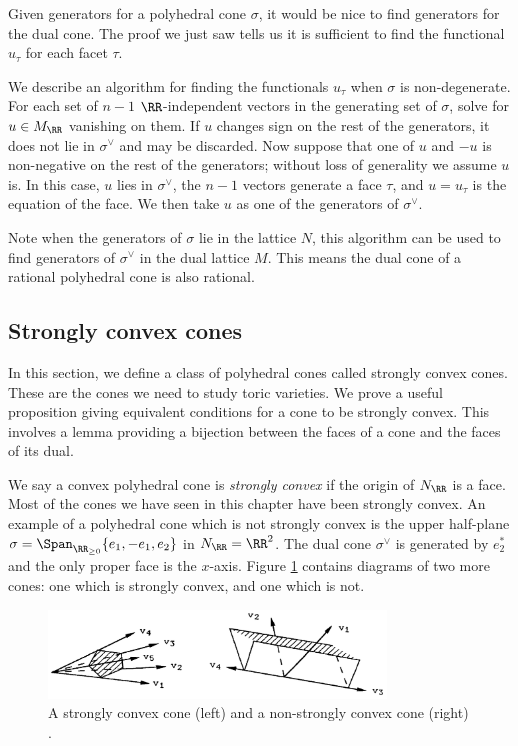 \documentclass[12pt]{amsart}
\theoremstyle{plain}
\begin{document}
Given generators for a polyhedral cone $\sigma$, it would be nice to find generators for the dual cone.
The proof we just saw tells us it is sufficient to find the functional $u_\tau$ for each facet $\tau$.

We describe an algorithm for finding the functionals $u_\tau$ when $\sigma$ is non-degenerate.
For each set of $n-1$ $\RR$-independent vectors in the generating set of $\sigma$, solve for $u \in M_\RR$ vanishing on them.
If $u$ changes sign on the rest of the generators, it does not lie in $\sigma^\vee$ and may be discarded.
Now suppose that one of $u$ and $-u$ is non-negative on the rest of the generators; without loss of generality we assume $u$ is.
In this case, $u$ lies in $\sigma^\vee$, the $n-1$ vectors generate a face $\tau$, and $u = u_\tau$ is the equation of the face.
We then take $u$ as one of the generators of $\sigma^\vee$.

Note when the generators of $\sigma$ lie in the lattice $N$, this algorithm can be used to find generators of $\sigma^\vee$ in the dual lattice $M$.
This means the dual cone of a rational polyhedral cone is also rational.





\subsection{Strongly convex cones}
In this section, we define a class of polyhedral cones called strongly convex cones.
These are the cones we need to study toric varieties.
We prove a useful proposition giving equivalent conditions for a cone to be strongly convex.
This involves a lemma providing a bijection between the faces of a cone and the faces of its dual.

We say a convex polyhedral cone is \emph{strongly convex} if the origin of $N_\RR$ is a face.
Most of the cones we have seen in this chapter have been strongly convex.
An example of a polyhedral cone which is not strongly convex is the upper half-plane $\sigma = \Span_{\RR_{\ge 0}}\{e_1, -e_1, e_2\}$ in $N_\RR=\RR^2$.
The dual cone $\sigma^\vee$ is generated by $e_2^*$ and the only proper face is the $x$-axis.
Figure \ref{figure:strongconvexity} contains diagrams of two more cones: one which is strongly convex, and one which is not.

\begin{figure}[h]
\centering
\includegraphics[width=0.8\textwidth]{../images/fultons_cones}
\caption{A strongly convex cone (left) and a non-strongly convex cone (right) \cite{Fulton93}.}
\label{figure:strongconvexity}
\end{figure}
\end{document}
